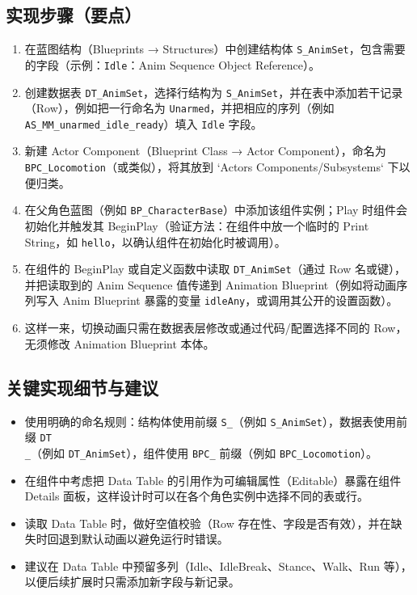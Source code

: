 \documentclass[10pt,CJKmath]{zhbook-v1}
\newcommand{\il}[1]{\texttt{#1}}%
\begin{document}
\subsection{实现步骤（要点）}
\begin{enumerate}
  \item 在蓝图结构（Blueprints → Structures）中创建结构体 \il{S_AnimSet}，包含需要的字段（示例：\il{Idle}：Anim Sequence Object Reference）。
  \item 创建数据表 \il{DT_AnimSet}，选择行结构为 \il{S_AnimSet}，并在表中添加若干记录（Row），例如把一行命名为 \il{Unarmed}，并把相应的序列（例如 \il{AS_MM_unarmed_idle_ready}）填入 \il{Idle} 字段。
  \item 新建 Actor Component（Blueprint Class → Actor Component），命名为 \il{BPC_Locomotion}（或类似），将其放到 `Actors Components/Subsystems` 下以便归类。
  \item 在父角色蓝图（例如 \il{BP_CharacterBase}）中添加该组件实例；Play 时组件会初始化并触发其 BeginPlay（验证方法：在组件中放一个临时的 Print String，如 \il{hello}，以确认组件在初始化时被调用）。
  \item 在组件的 BeginPlay 或自定义函数中读取 \il{DT_AnimSet}（通过 Row 名或键），并把读取到的 Anim Sequence 值传递到 Animation Blueprint（例如将动画序列写入 Anim Blueprint 暴露的变量 \il{idleAny}，或调用其公开的设置函数）。
  \item 这样一来，切换动画只需在数据表层修改或通过代码/配置选择不同的 Row，无须修改 Animation Blueprint 本体。
\end{enumerate}

\subsection{关键实现细节与建议}
\begin{itemize}
  \item 使用明确的命名规则：结构体使用前缀 \il{S\_}（例如 \il{S_AnimSet}），数据表使用前缀 \il{DT\\_}（例如 \il{DT_AnimSet}），组件使用 \il{BPC\_} 前缀（例如 \il{BPC_Locomotion}）。
  \item 在组件中考虑把 Data Table 的引用作为可编辑属性（Editable）暴露在组件 Details 面板，这样设计时可以在各个角色实例中选择不同的表或行。
  \item 读取 Data Table 时，做好空值校验（Row 存在性、字段是否有效），并在缺失时回退到默认动画以避免运行时错误。
  \item 建议在 Data Table 中预留多列（Idle、IdleBreak、Stance、Walk、Run 等），以便后续扩展时只需添加新字段与新记录。
\end{itemize}
\end{document}
